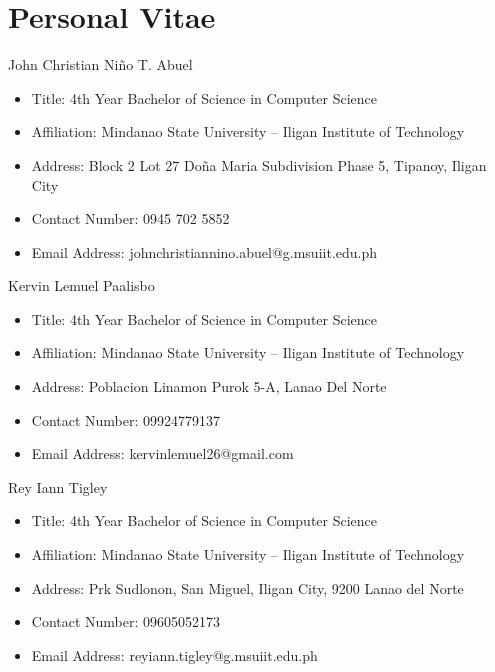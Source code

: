 \chapter{Personal Vitae}
John Christian Niño T. Abuel
\begin{itemize}
    \item Title: 4th Year Bachelor of Science in Computer Science
    \item Affiliation: Mindanao State University – Iligan Institute of Technology
    \item Address: Block 2 Lot 27 Doña Maria Subdivision Phase 5, Tipanoy, Iligan City
    \item Contact Number: 0945 702 5852
    \item Email Address: johnchristiannino.abuel@g.msuiit.edu.ph
\end{itemize}

Kervin Lemuel Paalisbo
\begin{itemize}
    \item Title: 4th Year Bachelor of Science in Computer Science
    \item Affiliation: Mindanao State University – Iligan Institute of Technology
    \item Address: Poblacion Linamon Purok 5-A, Lanao Del Norte
    \item Contact Number: 09924779137
    \item Email Address: kervinlemuel26@gmail.com
\end{itemize}
Rey Iann Tigley 
\begin{itemize}
    \item Title: 4th Year Bachelor of Science in Computer Science
    \item Affiliation: Mindanao State University – Iligan Institute of Technology
    \item Address:  Prk Sudlonon, San Miguel, Iligan City, 9200 Lanao del Norte
    \item Contact Number: 09605052173
    \item Email Address: reyiann.tigley@g.msuiit.edu.ph
\end{itemize}
